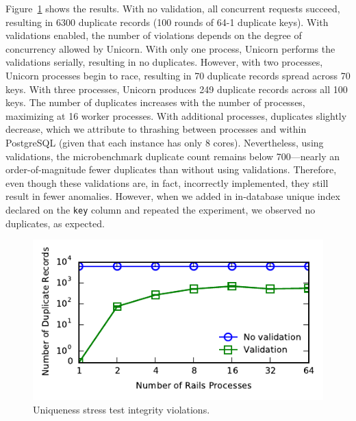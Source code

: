 Figure~\ref{fig:pk-stress} shows the results. With no validation, all
concurrent requests succeed, resulting in 6300 duplicate records (100
rounds of 64-1 duplicate keys). With validations enabled, the number
of violations depends on the degree of concurrency allowed by
Unicorn. With only one process, Unicorn performs the validations
serially, resulting in no duplicates. However, with two processes,
Unicorn processes begin to race, resulting in 70 duplicate records
spread across 70 keys. With three processes, Unicorn produces 249
duplicate records across all 100 keys. The number of duplicates
increases with the number of processes, maximizing at 16 worker
processes. With additional processes, duplicates slightly decrease,
which we attribute to thrashing between processes and within
PostgreSQL (given that each instance has only 8 cores). Nevertheless,
using validations, the microbenchmark duplicate count remains below
700---nearly an order-of-magnitude fewer duplicates than without using
validations. Therefore, even though these validations are, in fact,
incorrectly implemented, they still result in fewer
anomalies. However, when we added in in-database unique index declared
on the \texttt{key} column and repeated the experiment, we observed no
duplicates, as expected.

\begin{figure}
\includegraphics[width=\columnwidth]{figs/pk_stress_violations.pdf}\vspace{-1.5em}
\caption{Uniqueness stress test integrity violations.}
\label{fig:pk-stress}
\end{figure} 

